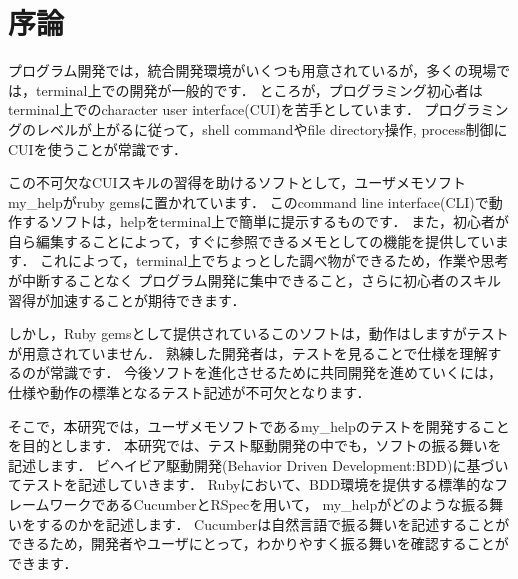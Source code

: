 \section{序論}
プログラム開発では，統合開発環境がいくつも用意されているが，多くの現場では，terminal上での開発が一般的です．
ところが，プログラミング初心者はterminal上でのcharacter user interface(CUI)を苦手としています．
プログラミングのレベルが上がるに従って，shell commandやfile directory操作, process制御にCUIを使うことが常識です．

この不可欠なCUIスキルの習得を助けるソフトとして，ユーザメモソフトmy\_helpがruby gemsに置かれています．
このcommand line interface(CLI)で動作するソフトは，helpをterminal上で簡単に提示するものです．
また，初心者が自ら編集することによって，すぐに参照できるメモとしての機能を提供しています．
これによって，terminal上でちょっとした調べ物ができるため，作業や思考が中断することなく
プログラム開発に集中できること，さらに初心者のスキル習得が加速することが期待できます．

しかし，Ruby gemsとして提供されているこのソフトは，動作はしますがテストが用意されていません．
熟練した開発者は，テストを見ることで仕様を理解するのが常識です．
今後ソフトを進化させるために共同開発を進めていくには，仕様や動作の標準となるテスト記述が不可欠となります．

そこで，本研究では，ユーザメモソフトであるmy\_helpのテストを開発することを目的とします．
本研究では、テスト駆動開発の中でも，ソフトの振る舞いを記述します．
ビヘイビア駆動開発(Behavior Driven Development:BDD)に基づいてテストを記述していきます．
Rubyにおいて、BDD環境を提供する標準的なフレームワークであるCucumberとRSpecを用いて，
my\_helpがどのような振る舞いをするのかを記述します．
Cucumberは自然言語で振る舞いを記述することができるため，開発者やユーザにとって，わかりやすく振る舞いを確認することができます．

